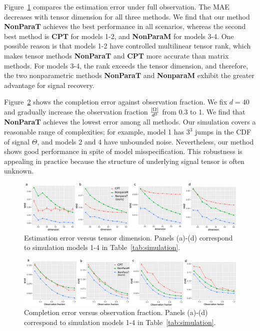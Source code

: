 \documentclass[twoside,11pt]{article}
\theoremstyle{plain}
\theoremstyle{definition}
\begin{document}
Figure~\ref{fig:compare1} compares the estimation error under full observation. The MAE decreases with tensor dimension for all three methods. We find that our method {\bf NonParaT} achieves the best performance in all scenarios, whereas the second best method is {\bf CPT} for models 1-2, and {\bf NonParaM} for models 3-4. One possible reason is that models 1-2 have controlled multilinear tensor rank, which makes tensor methods {\bf NonParaT} and {\bf CPT} more accurate than matrix methods. For models 3-4, the rank exceeds the tensor dimension, and therefore, the two nonparametric methods {\bf NonParaT} and {\bf NonparaM} exhibit the greater advantage for signal recovery. 



Figure~\ref{fig:compare2} shows the completion error against observation fraction. We fix $d=40$ and gradually increase the observation fraction ${|\Omega|\over d^3}$ from 0.3 to 1. We find that {\bf NonParaT} achieves the lowest error among all methods. Our simulation covers a reasonable range of  complexities; for example, model 1 has $3^3$ jumps in the CDF of signal $\Theta$, and models 2 and 4 have unbounded noise. Nevertheless, our method shows good performance in spite of model misspecification. This robustness is appealing in practice because the structure of underlying signal tensor is often unknown. 

\begin{figure}[h!]
\includegraphics[width=\textwidth]{figure/fig1-4v2.pdf}
\caption{Estimation error versus tensor dimension. Panels (a)-(d) correspond to simulation models 1-4 in Table~\ref{tab:simulation}.}\label{fig:compare1}
\end{figure}


\begin{figure}[h!]
\includegraphics[width=\textwidth]{figure/fig5-8v2.pdf}
\caption{Completion error versus observation fraction. Panels (a)-(d) correspond to simulation models 1-4 in Table~\ref{tab:simulation}. }\label{fig:compare2}
\end{figure}
\end{document}
